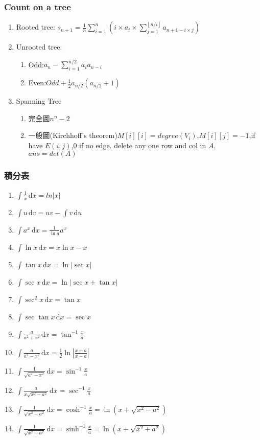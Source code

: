 \subsubsection{Count on a tree}
\begin{enumerate}\itemsep = -3pt
	\item Rooted tree: $s_{n+1}=\frac{1}{n}\sum_{i=1}^{n}(i\times a_i\times \sum_{j=1}^{\left \lfloor  n/i\right \rfloor} a_{n+1-i\times j})$
	\item Unrooted tree: 
	\begin{enumerate}\itemsep = -2pt
		\item Odd:$a_n-\sum_{i=1}^{n/2}a_ia_{n-i}$
		\item Even:$Odd+\frac{1}{2}a_{n/2}(a_{n/2}+1)$
	\end{enumerate}
	\item Spanning Tree
	\begin{enumerate}\itemsep = -2pt
		\item 完全圖$n^n-2$
		\item 一般圖(Kirchhoff's theorem)$M[i][i]=degree(V_i)$,$M[i][j]=-1$,if have $E(i,j)$,$0$ if no edge. delete any one row and col in $A$, $ans = det(A)$
	\end{enumerate}
\end{enumerate}

\subsubsection{積分表}
\begin{enumerate}\itemsep = -3pt
	\item $\int \frac{1}{x}\, \mathrm{d}x = ln|x|$
	\item $\int u\, \mathrm{d}v = uv-\int v\, \mathrm{d}u$
	\item $\int a^x\, \mathrm{d}x = \frac{1}{\ln a}a^x$
	\item $\int \ln x\, \mathrm{d}x = x\ln x-x$
	\item $\int \tan x\, \mathrm{d}x = \ln |\sec x|$
	\item $\int \sec x\, \mathrm{d}x = \ln |\sec x+\tan x|$
	\item $\int \sec^2 x\, \mathrm{d}x = \tan x$
	\item $\int \sec \tan x\, \mathrm{d}x = \sec x$
	\item $\int \frac{a}{a^2+x^2}\, \mathrm{d}x = \tan^{-1} \frac{x}{a}$
	\item $\int \frac{a}{a^2-x^2}\, \mathrm{d}x = \frac{1}{2}\ln |\frac{x+a}{x-a}|$
	\item $\int \frac{1}{\sqrt{a^2-x^2}}\, \mathrm{d}x = \sin^{-1} \frac{x}{a}$
	\item $\int \frac{a}{x\sqrt{x^2-a^2}}\, \mathrm{d}x = \sec^{-1} \frac{x}{a}$
	\item $\int \frac{1}{\sqrt{x^2-a^2}}\, \mathrm{d}x = \cosh^{-1} \frac{x}{a}=\ln (x+\sqrt{x^2-a^2})$
	\item $\int \frac{1}{\sqrt{x^2+a^2}}\, \mathrm{d}x = \sinh^{-1} \frac{x}{a}=\ln (x+\sqrt{x^2+a^2})$
\end{enumerate}

%